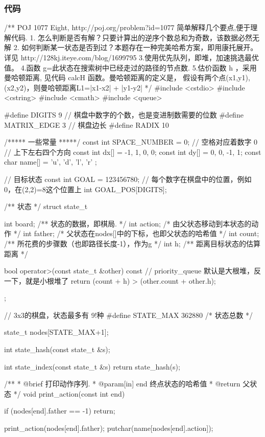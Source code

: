 \subsubsection{代码}
\begin{Codex}[label=eight_digits_astar.c]
/** POJ 1077 Eight, http://poj.org/problem?id=1077
 简单解释几个要点,便于理解代码.
1. 怎么判断是否有解？只要计算出的逆序个数总和为奇数，该数据必然无解
2. 如何判断某一状态是否到过？本题存在一种完美哈希方案，即用康托展开。
        详见 http://128kj.iteye.com/blog/1699795
3.使用优先队列，即堆，加速挑选最优值。
4.函数 g=此状态在搜索树中已经走过的路径的节点数.
5.估价函数 h ，采用曼哈顿距离, 见代码 calcH 函数。曼哈顿距离的定义是，
 假设有两个点(x1,y1),(x2,y2)，则曼哈顿距离L1=|x1-x2| + |y1-y2|
 */
#include <cstdio>
#include <cstring>
#include <cmath>
#include <queue>

#define DIGITS 9 // 棋盘中数字的个数，也是变进制数需要的位数
#define     MATRIX_EDGE 3       // 棋盘边长
#define RADIX 10

/***** 一些常量 *****/
const int SPACE_NUMBER = 0; // 空格对应着数字 0
// 上下左右四个方向
const int dx[] = {-1, 1, 0, 0};
const int dy[] = {0, 0, -1, 1};
const char name[] = { 'u', 'd', 'l', 'r' };

// 目标状态
const int GOAL = 123456780;
// 每个数字在棋盘中的位置，例如0，在(2,2)=8这个位置上
int GOAL_POS[DIGITS];


/** 状态 */
struct state_t {
    int board;  /** 状态的数据，即棋局. */
    int action; /* 由父状态移动到本状态的动作 */
    int father; /* 父状态在nodes[]中的下标，也即父状态的哈希值 */
    int count;  /** 所花费的步骤数（也即路径长度-1），作为g */
    int h; /** 距离目标状态的估算距离 */

    bool operator>(const state_t &other) const {
        // priority_queue 默认是大根堆，反一下，就是小根堆了
        return (count + h) > (other.count + other.h);
    }
};

// 3x3的棋盘，状态最多有 9!种
#define STATE_MAX 362880  /* 状态总数 */

state_t nodes[STATE_MAX+1];

int state_hash(const state_t &s);

int state_index(const state_t &s) {
    return state_hash(s);
}

/**
 * @brief 打印动作序列.
 * @param[in] end 终点状态的哈希值
 * @return 父状态
 */
void print_action(const int end) {
    if (nodes[end].father == -1) return;

    print_action(nodes[end].father);
    putchar(name[nodes[end].action]);
}


\end{Codex}
